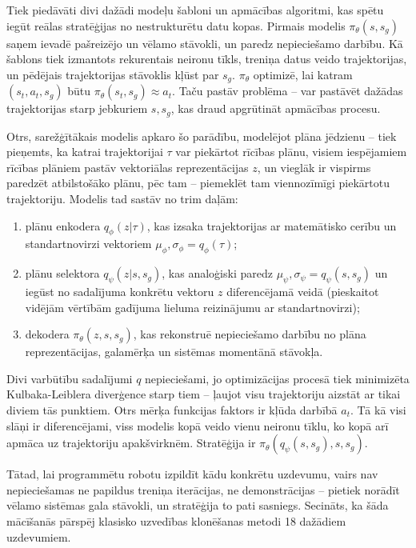 \documentclass[12pt, a4paper]{article}
\numberwithin{equation}{section} %
\begin{document}
Tiek piedāvāti divi dažādi modeļu šabloni un apmācības algoritmi, kas spētu iegūt reālas stratēģijas no nestrukturētu datu kopas. Pirmais modelis $\pi_{\theta}(s,s_g)$ saņem ievadē pašreizējo un vēlamo stāvokli, un paredz nepieciešamo darbību. Kā šablons tiek izmantots rekurentais neironu tīkls, treniņa datus veido trajektorijas, un pēdējais trajektorijas stāvoklis kļūst par $s_g$. $\pi_{\theta}$ optimizē, lai katram $(s_t, a_t, s_g)$ būtu $\pi_{\theta}(s_t, s_g) \approx a_t$. Taču pastāv problēma -- var pastāvēt dažādas trajektorijas starp jebkuriem $s, s_g$, kas draud apgrūtināt apmācības procesu.

Otrs, sarežģītākais modelis apkaro šo parādību, modelējot plāna jēdzienu -- tiek pieņemts, ka katrai trajektorijai $\tau$ var piekārtot rīcības plānu, visiem iespējamiem rīcības plāniem pastāv vektoriālas reprezentācijas $z$, un vieglāk ir vispirms paredzēt atbilstošāko plānu, pēc tam -- piemeklēt tam viennozīmīgi piekārtotu trajektoriju. Modelis tad sastāv no trim daļām:

\begin{enumerate}
    \item plānu enkodera $q_{\phi}(z \vert \tau)$, kas izsaka trajektorijas ar matemātisko cerību un standartnovirzi vektoriem $\mu_{\phi}, \sigma_{\phi} = q_{\phi}(\tau)$;
    \item plānu selektora $q_{\psi}(z \vert s, s_g)$, kas analoģiski paredz $\mu_{\psi}, \sigma_{\psi} = q_{\psi}(s, s_g)$ un iegūst no sadalījuma konkrētu vektoru $z$ diferencējamā veidā (pieskaitot vidējām vērtībām gadījuma lieluma reizinājumu ar standartnovirzi);
    \item dekodera $\pi_{\theta}(z, s, s_g)$, kas rekonstruē nepieciešamo darbību no plāna reprezentācijas, galamērķa un sistēmas momentānā stāvokļa.
\end{enumerate}

Divi varbūtību sadalījumi $q$ nepieciešami, jo optimizācijas procesā tiek minimizēta Kulbaka-Leiblera diverģence starp tiem -- ļaujot visu trajektoriju aizstāt ar tikai diviem tās punktiem. Otrs mērķa funkcijas faktors ir kļūda darbībā $a_t$. Tā kā visi slāņi ir diferencējami, viss modelis kopā veido vienu neironu tīklu, ko kopā arī apmāca uz trajektoriju apakšvirknēm. Stratēģija ir $\pi_{\theta}(q_{\psi}(s, s_g), s, s_g)$.

Tātad, lai programmētu robotu izpildīt kādu konkrētu uzdevumu, vairs nav nepieciešamas ne papildus treniņa iterācijas, ne demonstrācijas -- pietiek norādīt vēlamo sistēmas gala stāvokli, un stratēģija to pati sasniegs. Secināts, ka šāda mācīšanās pārspēj klasisko uzvedības klonēšanas metodi 18 dažādiem uzdevumiem.
\end{document}
